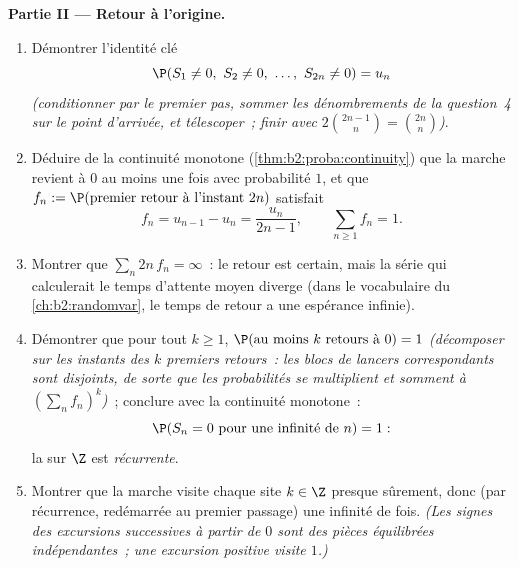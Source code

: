 \begin{problem}
\medskip
\noindent\textbf{Partie II --- Retour à l'origine.}
\begin{enumerate}[resume]
  \item Démontrer l'identité clé
        \[
        \P(S_1 \neq 0,\ S_2 \neq 0,\ \dots,\ S_{2n} \neq 0) =
        u_n
        \]
        \emph{(conditionner par le premier pas, sommer les dénombrements
        de la question~4 sur le point d'arrivée, et télescoper~; finir
        avec $2\binom{2n-1}{n} = \binom{2n}{n}$)}.
  \item Déduire de la continuité monotone
        (\cref{thm:b2:proba:continuity}) que la marche
        revient à $0$ au moins une fois avec probabilité $1$,
        et que $f_n := \P(\text{premier retour à l'instant }2n)$
        satisfait
        \[
        f_n = u_{n-1} - u_n = \frac{u_n}{2n-1},
        \qquad \sum_{n\geq1}f_n = 1 .
        \]
  \item Montrer que $\sum_n 2n\,f_n = \infty$~: le retour est
        certain, mais la série qui calculerait le temps d'attente
        moyen diverge (dans le vocabulaire du
        \cref{ch:b2:randomvar}, le temps de retour a une
        espérance infinie).
  \item Démontrer que pour tout $k \geq 1$, $\P(\text{au moins }
        k\text{ retours à }0) = 1$ \emph{(décomposer sur les
        instants des $k$ premiers retours~: les blocs de
        lancers correspondants sont disjoints, de sorte que les probabilités
        se multiplient et somment à $(\sum_nf_n)^k$)}~; conclure avec
        la continuité monotone~:
        \[
        \P(S_n = 0 \text{ pour une infinité de } n) = 1 :
        \]
        la  sur $\Z$ est \emph{récurrente}.
  \item Montrer que la marche visite chaque site $k \in \Z$
        presque sûrement, donc (par récurrence, redémarrée au
        premier passage) une infinité de fois. \emph{(Les signes
        des excursions successives à partir de $0$ sont des pièces
        équilibrées indépendantes~; une excursion positive visite $1$.)}
\end{enumerate}


\end{problem}
